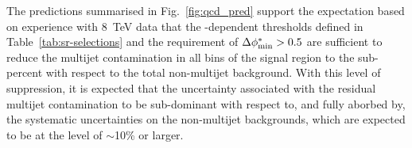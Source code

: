 The predictions summarised in Fig.~\ref{fig:qcd_pred} support the
expectation based on experience with 8~TeV data that the \HT-dependent
\alphat thresholds defined in Table~\ref{tab:sr-selections} and the
requirement of $\mbox{$\Delta\phi^{*}_{\rm min}$} > 0.5$ are sufficient to reduce the multijet
contamination in all bins of the signal region to the sub-percent with
respect to the total non-multijet background. With this level of
suppression, it is expected that the uncertainty associated with the
residual multijet contamination to be sub-dominant with respect to,
and fully aborbed by, the systematic uncertainties on the non-multijet
backgrounds, which are expected to be at the level of $\sim$10\% or
larger. 
